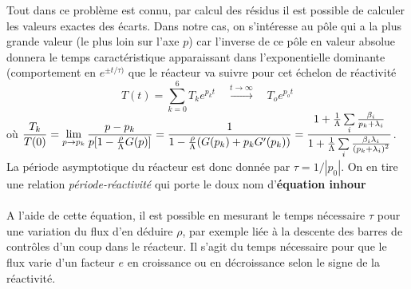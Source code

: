 Tout dans ce problème est connu, par calcul des résidus il est possible de calculer les valeurs 
exactes des écarts. Dans notre cas, on s'intéresse au pôle qui a la plus grande valeur (le plus loin
sur l'axe $p$) car l'inverse de ce pôle en valeur absolue donnera le temps caractéristique 
apparaissant dans l'exponentielle dominante (comportement en $e^{\pm t/\tau)}$ que le réacteur va
suivre pour cet échelon de réactivité
\begin{equation}
T(t) = \sum\limits_{k = 0}^6    {T_k}{e^{{p_k}t}}\quad\overset{t\to\infty}{\longrightarrow}\quad {T_o}{e^{{p_o}t}}
\end{equation}
où $\DS \frac{{{T_k}}}{{T(0)}} = \mathop {\lim }\limits_{p \to {p_k}} \frac{{p - {p_k}}}{{p[1 - {\textstyle{\rho  \over \Lambda }}G(p)]}} = \frac{1}{{1 - {\textstyle{\rho  \over \Lambda }}(G({p_k}) + {p_k}G'({p_k}))}}  = \frac{{1 + \frac{1}{\Lambda }\sum\limits_i    \frac{{{\beta _i}}}{{{p_k} + {\lambda _i}}}}}{{1 + \frac{1}{\Lambda }\sum\limits_i   \frac{{{\beta _i}{\lambda _i}}}{{{{({p_k} + {\lambda _i})}^2}}}}}$.\\

La période asymptotique du réacteur est donc donnée par $\tau = 1/|p_0|$. On en tire une relation
\textit{période-réactivité} qui porte le doux nom d'\textbf{équation inhour}\\

\ \\

A l'aide de cette équation, il est possible en mesurant le temps nécessaire $\tau$ pour une variation
du flux d'en déduire $\rho$, par exemple liée à la descente des barres de contrôles d'un coup dans 
le réacteur. Il s'agit du temps nécessaire pour que le flux varie d'un facteur $e$ en croissance ou en
décroissance selon le signe de la réactivité.

